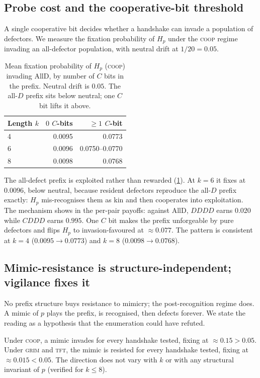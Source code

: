 \subsection{Probe cost and the cooperative-bit threshold}

A single cooperative bit decides whether a handshake can invade a population of defectors. We
measure the fixation probability of $H_p$ under the \textsc{coop} regime invading an
all-defector population, with neutral drift at $1/20 = 0.05$.

\begin{table}[t]
  \centering
  \caption{Mean fixation probability of $H_p$ (\textsc{coop}) invading AllD, by number of $C$
  bits in the prefix. Neutral drift is $0.05$. The all-$D$ prefix sits below neutral; one $C$
  bit lifts it above.}
  \label{tab:invade}
  \begin{tabular}{lrr}
    \toprule
    Length $k$ & $0$ $C$-bits & $\ge 1$ $C$-bit \\
    \midrule
    4 & 0.0095 & 0.0773 \\
    6 & 0.0096 & 0.0750--0.0770 \\
    8 & 0.0098 & 0.0768 \\
    \bottomrule
  \end{tabular}
\end{table}

The all-defect prefix is exploited rather than rewarded (\cref{tab:invade}). At $k=6$ it fixes
at $0.0096$, below neutral, because resident defectors reproduce the all-$D$ prefix exactly:
$H_p$ mis-recognises them as kin and then cooperates into exploitation. The mechanism shows in
the per-pair payoffs: against AllD, $DDDD$ earns $0.020$ while $CDDD$ earns $0.995$. One $C$
bit makes the prefix unforgeable by pure defectors and flips $H_p$ to invasion-favoured at
$\approx 0.077$. The pattern is consistent at $k=4$ ($0.0095 \to 0.0773$) and $k=8$
($0.0098 \to 0.0768$).

\subsection{Mimic-resistance is structure-independent; vigilance fixes it}

No prefix structure buys resistance to mimicry; the post-recognition regime does. A mimic of
$p$ plays the prefix, is recognised, then defects forever. We state the reading as a
hypothesis that the enumeration could have refuted.

\begin{observation}\label{obs:regime}
Under \textsc{coop}, a mimic invades for every handshake tested, fixing at $\approx 0.15 > 0.05$.
Under \textsc{grim} and \textsc{tft}, the mimic is resisted for every handshake tested, fixing
at $\approx 0.015 < 0.05$. The direction does not vary with $k$ or with any structural
invariant of $p$ (verified for $k\le 8$).
\end{observation}


